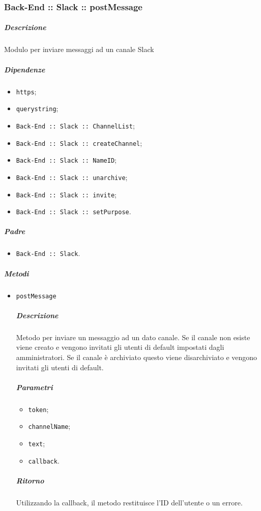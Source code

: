 \documentclass[../ManualeSviluppatore_v2.0.0.tex]{subfiles}
\begin{document}
\subsubsection{Back-End :: Slack :: postMessage}
\subparagraph{Descrizione} Modulo per inviare messaggi ad un canale Slack
\subparagraph{Dipendenze}
\begin{itemize}
	\item \texttt{https};
	\item \texttt{querystring};
	\item \texttt{Back-End :: Slack :: ChannelList};
	\item \texttt{Back-End :: Slack :: createChannel};
	\item \texttt{Back-End :: Slack :: NameID};
	\item \texttt{Back-End :: Slack :: unarchive};
	\item \texttt{Back-End :: Slack :: invite};
	\item \texttt{Back-End :: Slack :: setPurpose}.
\end{itemize}
\subparagraph{Padre}
\begin{itemize}
	\item \texttt{Back-End :: Slack}.
\end{itemize}
\subparagraph{Metodi}
\begin{itemize}
	\item \texttt{postMessage}
	      \subparagraph{Descrizione} Metodo per inviare un messaggio ad un dato canale. Se il canale non esiste viene creato e vengono invitati gli utenti di default impostati dagli amministratori. Se il canale è archiviato questo viene disarchiviato e vengono invitati gli utenti di default.
	      \subparagraph{Parametri}
	      \begin{itemize}
	      	\item \texttt{token};
	      	\item \texttt{channelName};
	      	\item \texttt{text};
	      	\item \texttt{callback}.
	      \end{itemize}
	      \subparagraph{Ritorno} Utilizzando la callback, il metodo restituisce l'ID dell'utente o un errore.
\end{itemize}
\end{document}
